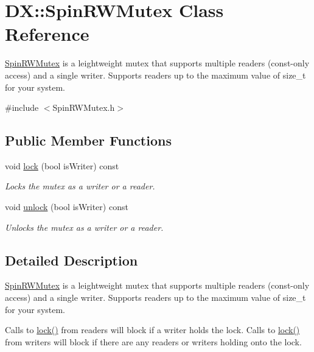 \hypertarget{class_d_x_1_1_spin_r_w_mutex}{\section{D\-X\-:\-:Spin\-R\-W\-Mutex Class Reference}
\label{class_d_x_1_1_spin_r_w_mutex}
}


\hyperlink{class_d_x_1_1_spin_r_w_mutex}{Spin\-R\-W\-Mutex} is a leightweight mutex that supports multiple readers (const-\/only access) and a single writer. Supports readers up to the maximum value of size\-\_\-t for your system.  




{\ttfamily \#include $<$Spin\-R\-W\-Mutex.\-h$>$}

\subsection*{Public Member Functions}
\begin{DoxyCompactItemize}
\item 
void \hyperlink{class_d_x_1_1_spin_r_w_mutex_a8fe3a96117f0c9594135747f12548add}{lock} (bool is\-Writer) const 
\begin{DoxyCompactList}\small\item\em Locks the mutex as a writer or a reader. \end{DoxyCompactList}\item 
\hypertarget{class_d_x_1_1_spin_r_w_mutex_a5475d76504c9c0519bea4fa68c995f9d}{void \hyperlink{class_d_x_1_1_spin_r_w_mutex_a5475d76504c9c0519bea4fa68c995f9d}{unlock} (bool is\-Writer) const }\label{class_d_x_1_1_spin_r_w_mutex_a5475d76504c9c0519bea4fa68c995f9d}

\begin{DoxyCompactList}\small\item\em Unlocks the mutex as a writer or a reader. \end{DoxyCompactList}\end{DoxyCompactItemize}


\subsection{Detailed Description}
\hyperlink{class_d_x_1_1_spin_r_w_mutex}{Spin\-R\-W\-Mutex} is a leightweight mutex that supports multiple readers (const-\/only access) and a single writer. Supports readers up to the maximum value of size\-\_\-t for your system. 

Calls to \hyperlink{class_d_x_1_1_spin_r_w_mutex_a8fe3a96117f0c9594135747f12548add}{lock()} from readers will block if a writer holds the lock. Calls to \hyperlink{class_d_x_1_1_spin_r_w_mutex_a8fe3a96117f0c9594135747f12548add}{lock()} from writers will block if there are any readers or writers holding onto the lock.


